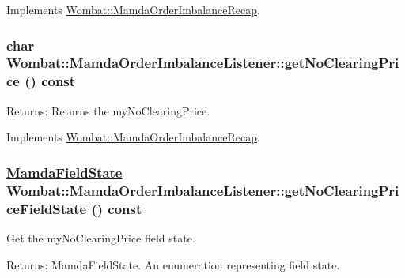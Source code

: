 Implements \hyperlink{classWombat_1_1MamdaOrderImbalanceRecap_dd69e2d456848710dbeff6a835c2b3ce}{Wombat::Mamda\-Order\-Imbalance\-Recap}.\hypertarget{classWombat_1_1MamdaOrderImbalanceListener_c9c3e649371b664623b47f1153927024}{
\subsubsection[getNoClearingPrice]{\setlength{\rightskip}{0pt plus 5cm}char Wombat::Mamda\-Order\-Imbalance\-Listener::get\-No\-Clearing\-Price () const}}
\label{classWombat_1_1MamdaOrderImbalanceListener_c9c3e649371b664623b47f1153927024}


\begin{Desc}
\item[Returns:]Returns the my\-No\-Clearing\-Price. \end{Desc}


Implements \hyperlink{classWombat_1_1MamdaOrderImbalanceRecap_448c70dec05ba4ec25e00cb497310cb8}{Wombat::Mamda\-Order\-Imbalance\-Recap}.\hypertarget{classWombat_1_1MamdaOrderImbalanceListener_c0d44a700d7ff3107cd46c0531c4634f}{
\subsubsection[getNoClearingPriceFieldState]{\setlength{\rightskip}{0pt plus 5cm}\hyperlink{namespaceWombat_93aac974f2ab713554fd12a1fa3b7d2a}{Mamda\-Field\-State} Wombat::Mamda\-Order\-Imbalance\-Listener::get\-No\-Clearing\-Price\-Field\-State () const}}
\label{classWombat_1_1MamdaOrderImbalanceListener_c0d44a700d7ff3107cd46c0531c4634f}


Get the my\-No\-Clearing\-Price field state. 

\begin{Desc}
\item[Returns:]Mamda\-Field\-State. An enumeration representing field state. \end{Desc}



